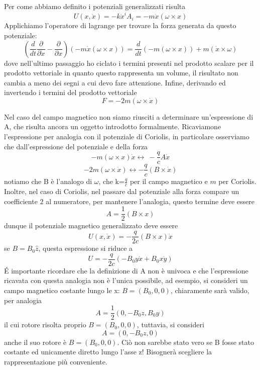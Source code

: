 \documentclass[
10pt, %
a4paper, %
oneside, %
headinclude,footinclude, %
BCOR5mm, %
]{scrartcl}
\begin{document}
\begin{esempio}
\begin{osservazione}
	\end{osservazione}
	Per come abbiamo definito i potenziali generalizzati risulta
	\[U(x, \dot{x}) = -k\dot{x}^iA_i =-m\dot{x}(\omega\times x)\]
	Applichiamo l'operatore di lagrange per trovare la forza generata da questo potenziale:
	\[\left(\frac{d}{dt}\frac{\partial}{\partial\dot{x}}-\frac{\partial}{\partial x}\right) \left(-m\dot{x}(\omega \times x)\right) = \frac{d}{dt}(-m(\omega \times x))+m(\dot{x}\times \omega) \]
	dove nell'ultimo passaggio ho ciclato i termini presenti nel prodotto scalare per il prodotto vettoriale in quanto questo rappresenta un volume, il risultato non cambia a meno dei segni a cui devo fare attenzione. Infine, derivando ed invertendo i termini del prodotto vettoriale
	\[F= -2m(\omega\times\dot{x})\]
\end{esempio}
\begin{esempio}
Nel caso del campo magnetico non siamo riusciti a determinare un'espressione di A, che risulta ancora un oggetto introdotto formalmente. Ricaviamone l'espressione per analogia con il potenziale di Coriolis, in particolare osserviamo che dall'espressione del potenziale e della forza
\[-m(\omega\times{x})\dot{x}\leftrightarrow\ -\frac{q}{c}A\dot{x} \]
\[-2m(\omega\times\dot{x})\leftrightarrow -\frac{q}{c}(B\times\dot{x})\]
notiamo che B è l'analogo di $\omega$, che k=$\frac{q}{c}$ per il campo magnetico e \(m\) per Coriolis. Inoltre, nel caso di Coriolis, nel passare dal potenziale alla forza compare un coefficiente \(2\) al numeratore, per mantenere l'analogia, questo termine deve essere
\[A = \frac{1}{2}(B\times x)\] 
dunque il potenziale magnetico generalizzato deve essere
\[U(x, \dot{x}) = -\frac{q}{2c}(B\times x)\dot{x}\]
se \(B = B_0\hat{z}\), questa espressione si riduce a 
\[U = -\frac{q}{2c}(-B_0y\dot{x}+B_0x\dot{y})\]
\'E importante ricordare che la definizione di A non è univoca e che l'espressione ricavata con questa analogia non è l'unica possibile, ad esempio, si consideri un campo magnetico costante lungo le x: \(B = (B_0, 0, 0)\), chiaramente sarà valido, per analogia
\[A = \frac{1}{2}(0, -B_0 z, B_0 y)\]
il cui rotore risolta proprio \(B = (B_0, 0, 0)\), tuttavia, si consideri
\[A = (0, -B_0 z, 0)\]
anche il suo rotore è \(B = (B_0, 0, 0)\). Ciò non sarebbe stato vero se B fosse stato costante ed unicamente diretto lungo l'asse z! Bisognerà scegliere la rappresentazione più conveniente.
\end{esempio}
\end{document}
